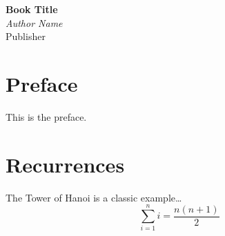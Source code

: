 \documentclass[a5paper, 12pt]{memoir}
\begin{document}
\frontmatter %

\begin{titlingpage}
  \vspace*{\fill}
  \begin{center}
    {\Huge\bfseries Book Title}\\[1.5em]
    {\large\itshape Author Name}\\[3em]
    {\large Publisher }
  \end{center}
  \vspace*{\fill}
\end{titlingpage}

\tableofcontents


\chapter{Preface}
This is the preface.


\mainmatter %

\chapter{Recurrences}
The Tower of Hanoi is a classic example\ldots
\[ \sum_{i=1}^n i = \frac{n(n+1)}{2} \]
\end{document}
